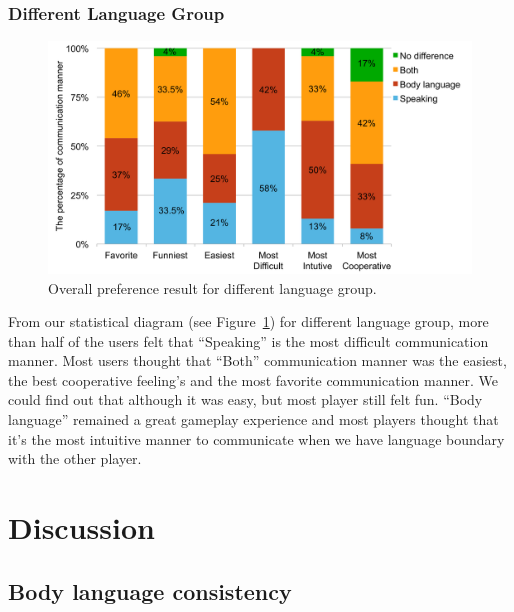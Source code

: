 \subsubsection{Different Language Group}

\begin{figure}[!h]
\centering
\includegraphics[width=0.9\columnwidth]{Figures/US_FQ_Dif.pdf}
\caption{Overall preference result for different language group.}
\label{fig:US_FQ_Dif}
\end{figure}

From our statistical diagram (see Figure~\ref{fig:US_FQ_Dif}) for different language group, more than half of the users felt that ``Speaking'' is the most difficult communication manner.
Most users thought that ``Both'' communication manner was the easiest, the best cooperative feeling's and the most favorite communication manner. We could find out that although it was easy, but most player still felt fun. ``Body language'' remained a great gameplay experience and most players thought that it's the most intuitive manner to communicate when we have language boundary with the other player.


\section{Discussion}

\subsection{Body language consistency}

